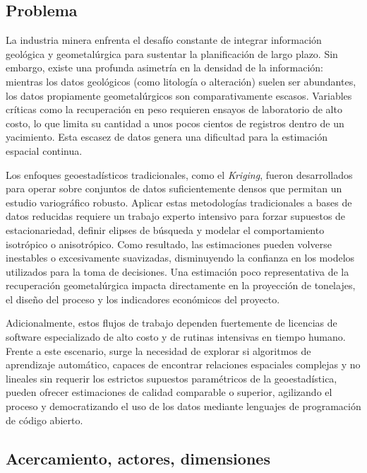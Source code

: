 \documentclass[12pt,letterpaper]{article}
\begin{document}
	\subsection{Problema}
	
	La industria minera enfrenta el desafío constante de integrar información 
	geológica y geometalúrgica para sustentar la planificación de largo plazo. 
	Sin embargo, existe una profunda asimetría en la densidad de la información: 
	mientras los datos geológicos (como litología o alteración) suelen ser 
	abundantes, los datos propiamente geometalúrgicos son comparativamente escasos. 
	Variables críticas como la recuperación en peso requieren ensayos de laboratorio 
	de alto costo, lo que limita su cantidad a unos pocos cientos de registros 
	dentro de un yacimiento. Esta escasez de datos genera una dificultad para la 
	estimación espacial continua.
	
	Los enfoques geoestadísticos tradicionales, como el \textit{Kriging}, fueron 
	desarrollados para operar sobre conjuntos de datos suficientemente densos que 
	permitan un estudio variográfico robusto. Aplicar estas metodologías 
	tradicionales a bases de datos reducidas requiere un trabajo experto intensivo 
	para forzar supuestos de estacionariedad, definir elipses de búsqueda y modelar 
	el comportamiento isotrópico o anisotrópico. Como resultado, las estimaciones 
	pueden volverse inestables o excesivamente suavizadas, disminuyendo la confianza 
	en los modelos utilizados para la toma de decisiones. Una estimación poco 
	representativa de la recuperación geometalúrgica impacta directamente en la 
	proyección de tonelajes, el diseño del proceso y los indicadores económicos del 
	proyecto.
	
	Adicionalmente, estos flujos de trabajo dependen fuertemente de licencias de 
	software especializado de alto costo y de rutinas intensivas en tiempo humano. 
	Frente a este escenario, surge la necesidad de explorar si algoritmos de 
	aprendizaje automático, capaces de encontrar relaciones espaciales complejas y 
	no lineales sin requerir los estrictos supuestos paramétricos de la 
	geoestadística, pueden ofrecer estimaciones de calidad comparable o superior, 
	agilizando el proceso y democratizando el uso de los datos mediante lenguajes 
	de programación de código abierto.
	
	\subsection{Acercamiento, actores, dimensiones}
	
\end{document}
